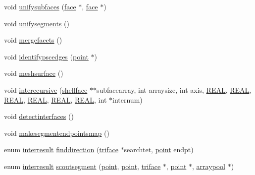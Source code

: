 \begin{DoxyCompactItemize}
\item 
void \hyperlink{classtetgenmesh_afc39c975666d8787e07ad45a9d2e1e67}{unifysubfaces} (\hyperlink{classtetgenmesh_1_1face}{face} $\ast$, \hyperlink{classtetgenmesh_1_1face}{face} $\ast$)
\item 
void \hyperlink{classtetgenmesh_adcb0e0e582808c23829b42708a7596dc}{unifysegments} ()
\item 
void \hyperlink{classtetgenmesh_a5abff2e7fa8ae0632729d11f61c9f2a8}{mergefacets} ()
\item 
void \hyperlink{classtetgenmesh_a3193fcbef94cca623411966a3661f215}{identifypscedges} (\hyperlink{classtetgenmesh_ace3fb4f80389185b7c9b18ab69a3dea2}{point} $\ast$)
\item 
void \hyperlink{classtetgenmesh_a0c51cd3511d2b0ef9d0d45fe8b546b2e}{meshsurface} ()
\item 
void \hyperlink{classtetgenmesh_a46c5e7f1f3f94dd0c493f2b559671854}{interecursive} (\hyperlink{classtetgenmesh_ad4860123b88783b943fa6452e886a2cb}{shellface} $\ast$$\ast$subfacearray, int arraysize, int axis, \hyperlink{tetgen_8h_a4b654506f18b8bfd61ad2a29a7e38c25}{R\+E\+AL}, \hyperlink{tetgen_8h_a4b654506f18b8bfd61ad2a29a7e38c25}{R\+E\+AL}, \hyperlink{tetgen_8h_a4b654506f18b8bfd61ad2a29a7e38c25}{R\+E\+AL}, \hyperlink{tetgen_8h_a4b654506f18b8bfd61ad2a29a7e38c25}{R\+E\+AL}, \hyperlink{tetgen_8h_a4b654506f18b8bfd61ad2a29a7e38c25}{R\+E\+AL}, \hyperlink{tetgen_8h_a4b654506f18b8bfd61ad2a29a7e38c25}{R\+E\+AL}, int $\ast$internum)
\item 
void \hyperlink{classtetgenmesh_a854e8e8d77d2d1b2b74372a87a1a7717}{detectinterfaces} ()
\item 
void \hyperlink{classtetgenmesh_ac56b6a4bdcc053b5cc6afc005c8e1a69}{makesegmentendpointsmap} ()
\item 
enum \hyperlink{classtetgenmesh_a01d2be902350e1bf8f20e650d687a793}{interresult} \hyperlink{classtetgenmesh_a3a5775d49e7848f08bb749944b6e8070}{finddirection} (\hyperlink{classtetgenmesh_1_1triface}{triface} $\ast$searchtet, \hyperlink{classtetgenmesh_ace3fb4f80389185b7c9b18ab69a3dea2}{point} endpt)
\item 
enum \hyperlink{classtetgenmesh_a01d2be902350e1bf8f20e650d687a793}{interresult} \hyperlink{classtetgenmesh_a3be778eee0a5b02fde28bd82816e9f1a}{scoutsegment} (\hyperlink{classtetgenmesh_ace3fb4f80389185b7c9b18ab69a3dea2}{point}, \hyperlink{classtetgenmesh_ace3fb4f80389185b7c9b18ab69a3dea2}{point}, \hyperlink{classtetgenmesh_1_1triface}{triface} $\ast$, \hyperlink{classtetgenmesh_ace3fb4f80389185b7c9b18ab69a3dea2}{point} $\ast$, \hyperlink{classtetgenmesh_1_1arraypool}{arraypool} $\ast$)
$$
\end{DoxyCompactItemize}
